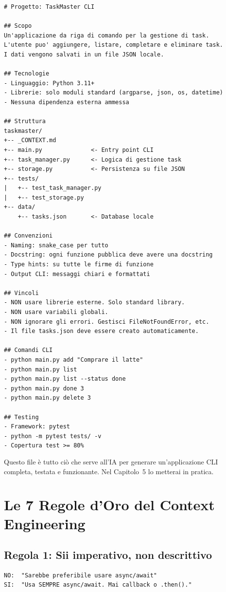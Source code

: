 \begin{lstlisting}[language={},title={\texttt{\_CONTEXT.md} per TaskMaster CLI}]
# Progetto: TaskMaster CLI

## Scopo
Un'applicazione da riga di comando per la gestione di task.
L'utente puo' aggiungere, listare, completare e eliminare task.
I dati vengono salvati in un file JSON locale.

## Tecnologie
- Linguaggio: Python 3.11+
- Librerie: solo moduli standard (argparse, json, os, datetime)
- Nessuna dipendenza esterna ammessa

## Struttura
taskmaster/
+-- _CONTEXT.md
+-- main.py              <- Entry point CLI
+-- task_manager.py      <- Logica di gestione task
+-- storage.py           <- Persistenza su file JSON
+-- tests/
|   +-- test_task_manager.py
|   +-- test_storage.py
+-- data/
    +-- tasks.json       <- Database locale

## Convenzioni
- Naming: snake_case per tutto
- Docstring: ogni funzione pubblica deve avere una docstring
- Type hints: su tutte le firme di funzione
- Output CLI: messaggi chiari e formattati

## Vincoli
- NON usare librerie esterne. Solo standard library.
- NON usare variabili globali.
- NON ignorare gli errori. Gestisci FileNotFoundError, etc.
- Il file tasks.json deve essere creato automaticamente.

## Comandi CLI
- python main.py add "Comprare il latte"
- python main.py list
- python main.py list --status done
- python main.py done 3
- python main.py delete 3

## Testing
- Framework: pytest
- python -m pytest tests/ -v
- Copertura test >= 80%
\end{lstlisting}

\begin{checkpointbox}
Questo file è tutto ciò che serve all'IA per generare un'applicazione CLI completa, testata e funzionante. Nel Capitolo~5 lo metterai in pratica.
\end{checkpointbox}

\section{Le 7 Regole d'Oro del Context Engineering}

\subsection*{Regola 1: Sii imperativo, non descrittivo}
\begin{lstlisting}[language={}]
NO:  "Sarebbe preferibile usare async/await"
SI:  "Usa SEMPRE async/await. Mai callback o .then()."
\end{lstlisting}

